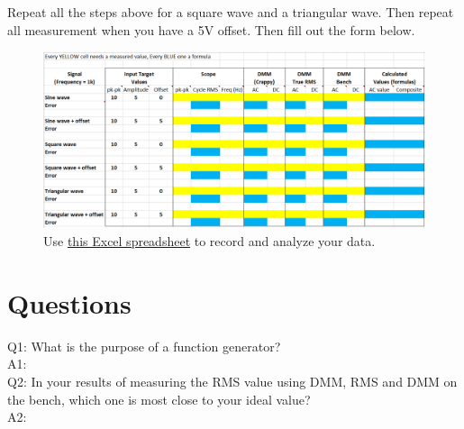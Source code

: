\documentclass[11pt,letterpaper]{article}
\begin{document}
Repeat all the steps above for a square wave and a triangular wave. Then repeat all measurement when you have a 5V offset. Then fill out the form below.
\begin{figure}
\centering
\includegraphics[width=1\linewidth]{Lab2_Table1}
\caption{ Use \href{http://abe-research.illinois.edu/Faculty/grift/ABE425_2016/Labs/Lab2_InstrumentFamiliarization/Lab2_Table1.xlsx}{this Excel spreadsheet} to record and analyze your data.}
\label{fig:Lab2_Table1}
\end{figure}

\section{Questions}

Q1: What is the purpose of a function generator?\\
A1:\\


Q2: In your results of measuring the RMS value using DMM, RMS and DMM on the bench, which one is most close to your ideal value?\\
A2:\\
\end{document}
